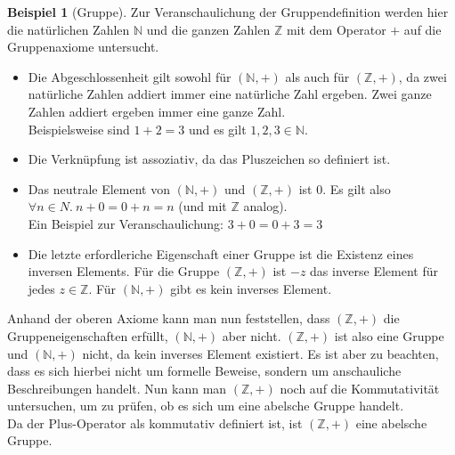 \documentclass[12pt,a4paper, usenames, dvipsnames]{article}
\theoremstyle{mystyle}
\theoremstyle{definition}
\newtheorem{bsp}{Beispiel}[definition]
\begin{document}
\begin{bsp}[Gruppe]

Zur Veranschaulichung der Gruppendefinition werden hier die natürlichen Zahlen $\mathbb{N}$ und die ganzen Zahlen $\mathbb{Z}$ mit dem Operator $+$ auf die Gruppenaxiome untersucht.
\begin{itemize}
\item Die Abgeschlossenheit gilt sowohl für $(\mathbb{N},+)$ als auch für $(\mathbb{Z},+)$, da zwei natürliche Zahlen addiert immer eine natürliche Zahl ergeben. Zwei ganze Zahlen addiert ergeben immer eine ganze Zahl. \\
Beispielsweise sind $1+2=3$ und es gilt $1,2,3 \in \mathbb{N}$.
\item Die Verknüpfung ist assoziativ, da das Pluszeichen so definiert ist.
\item Das neutrale Element von $(\mathbb{N},+)$ und $(\mathbb{Z},+)$ ist $0$. Es gilt also $\forall n \in N. \ n + 0 = 0 + n = n$ (und mit $\mathbb{Z}$ analog). \\
Ein Beispiel zur Veranschaulichung: $3+0=0+3=3$
\item Die letzte erfordleriche Eigenschaft einer Gruppe ist die Existenz eines inversen Elements. Für die Gruppe $(\mathbb{Z},+)$ ist $-z$ das inverse Element für jedes $z \in \mathbb{Z}$. Für $(\mathbb{N},+)$ gibt es kein inverses Element.
\end{itemize}
Anhand der oberen Axiome kann man nun feststellen, dass $(\mathbb{Z},+)$ die Gruppeneigenschaften erfüllt, $(\mathbb{N},+)$ aber nicht. 
$(\mathbb{Z},+)$ ist also eine Gruppe und $(\mathbb{N},+)$ nicht, da kein inverses Element existiert. 
Es ist aber zu beachten, dass es sich hierbei nicht um formelle Beweise, sondern um anschauliche Beschreibungen handelt.
Nun kann man $(\mathbb{Z},+)$ noch auf die Kommutativität untersuchen, um zu prüfen, ob es sich um eine abelsche Gruppe handelt. \\
Da der Plus-Operator als kommutativ definiert ist, ist $(\mathbb{Z},+)$ eine abelsche Gruppe.

\end{bsp}
\end{document}
